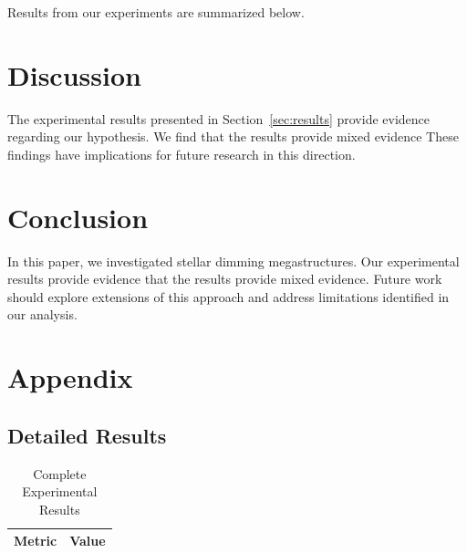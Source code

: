 \documentclass{article}
\begin{document}
\label{sec:results}

Results from our experiments are summarized below.

\section{Discussion}

The experimental results presented in Section~\ref{sec:results} provide evidence regarding our hypothesis. We find that the results provide mixed evidence These findings have implications for future research in this direction.

\section{Conclusion}

In this paper, we investigated stellar dimming megastructures. Our experimental results provide evidence that the results provide mixed evidence. Future work should explore extensions of this approach and address limitations identified in our analysis.

\appendix

\section{Appendix}

\subsection{Detailed Results}

\begin{table}[htbp]
\centering
\caption{Complete Experimental Results}
\begin{tabular}{lc}
\toprule
Metric & Value \\
\midrule
\bottomrule
\end{tabular}
\end{table}




\end{document}
